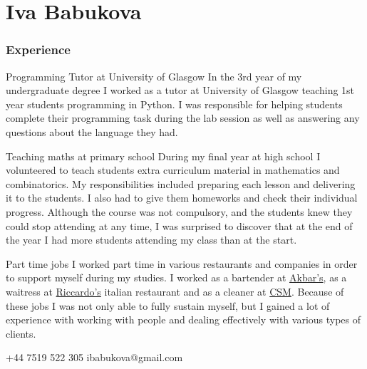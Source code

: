 \documentclass{tccv}
\begin{document}
\setlength{\emergencystretch}{3em}
\part{Iva Babukova}

\section{\LARGE Experience \normalsize}

\begin{skillist}

\item{Programming Tutor at University of Glasgow} {In the 3rd year of my undergraduate degree I worked as a tutor at University of Glasgow teaching 1st year students programming in Python. I was responsible for helping students complete their programming task during the lab session as well as answering any questions about the language they had.}

\item{Teaching maths at primary school} {During my final year at high school I volunteered to teach students extra curriculum material in mathematics and combinatorics. My responsibilities included preparing each lesson and delivering it to the students. I also had to give them homeworks and check their individual progress. Although the course was not compulsory, and the students knew they could stop attending at any time, I was surprised to discover that at the end of the year I had more students attending my class than at the start.}

\item{Part time jobs} {I worked part time in various restaurants and companies in order to support myself during my studies. I worked as a bartender at \href{http://www.akbars.co.uk/glasgow}{Akbar's}, as a waitress at \href{http://www.tripadvisor.co.uk/Restaurant_Review-g186534-d4087172-Reviews-Riccardo_s_Italian_Kitchen-Glasgow_Scotland.html}{Riccardo's} italian restaurant and as a cleaner at \href{http://www.csmfacilities.co.uk/cleaning-company-glasgow/}{CSM}. Because of these jobs I was not only able to fully sustain myself, but I gained a lot of experience with working with people and dealing effectively with various types of clients.}

\end{skillist}

    {+44 7519 522 305}
    {ibabukova@gmail.com}
\end{document}
